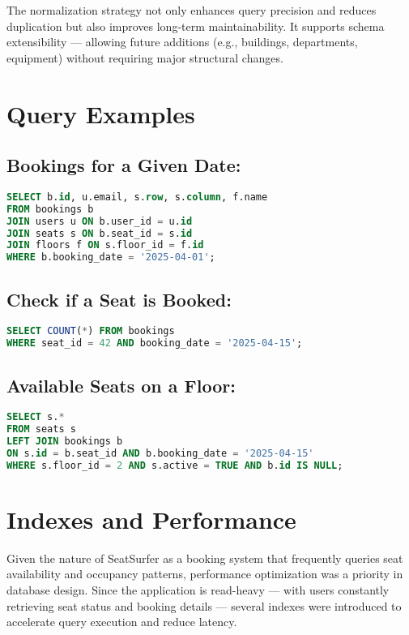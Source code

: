 \documentclass[12pt,a4paper]{report}
\begin{document}
The normalization strategy not only enhances query precision and reduces duplication but also improves long-term maintainability. It supports schema extensibility — allowing future additions (e.g., buildings, departments, equipment) without requiring major structural changes.

\section{Query Examples}

\subsection*{Bookings for a Given Date:}

\begin{lstlisting}[language=SQL]
SELECT b.id, u.email, s.row, s.column, f.name
FROM bookings b
JOIN users u ON b.user_id = u.id
JOIN seats s ON b.seat_id = s.id
JOIN floors f ON s.floor_id = f.id
WHERE b.booking_date = '2025-04-01';
\end{lstlisting}

\subsection*{Check if a Seat is Booked:}

\begin{lstlisting}[language=SQL]
SELECT COUNT(*) FROM bookings
WHERE seat_id = 42 AND booking_date = '2025-04-15';
\end{lstlisting}

\subsection*{Available Seats on a Floor:}

\begin{lstlisting}[language=SQL]
SELECT s.*
FROM seats s
LEFT JOIN bookings b
ON s.id = b.seat_id AND b.booking_date = '2025-04-15'
WHERE s.floor_id = 2 AND s.active = TRUE AND b.id IS NULL;
\end{lstlisting}

\section{Indexes and Performance}

Given the nature of SeatSurfer as a booking system that frequently queries seat availability and occupancy patterns, performance optimization was a priority in database design. Since the application is read-heavy — with users constantly retrieving seat status and booking details — several indexes were introduced to accelerate query execution and reduce latency.
\end{document}
